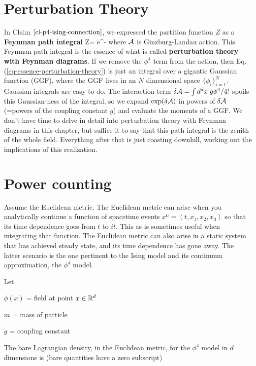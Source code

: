  


\section{Perturbation Theory}

 In Claim $\ref{cl-p4-ising-connection}$, we expressed the  partition function $Z$ as a {\bf Feynman path integral}
\beq
Z= \int \cald\phi\; e^{-\cala}
\label{eq-essence-perturbation-theory}
\eeq
where ${\cal A}$ is 
Ginzburg-Landau action. 
This Feynman path integral
is the essence
of what is called {\bf perturbation
theory with Feynman diagrams}.
If we remove the $\phi^4$ term
from the action, then Eq.(\ref{eq-essence-perturbation-theory}) is just an integral over a  gigantic Gaussian function (GGF), where the GGF lives in an $N$ dimensional space $\{\phi_i\}_{i=1}^N$.
Gaussian integrals are easy to do. The interaction term $\delta {\cal A}=\int d^dx\;g\phi^4/4!$ spoils this Gaussian-ness of the integral, so we expand $\exp(\delta {\cal A})$ in powers of $\delta {\cal A}$ (=powers of the coupling constant $g$)
and evaluate the moments of a GGF. We don't have time
to delve in detail into 
perturbation theory with Feynman diagrams
in this chapter, 
but suffice it to say that this path integral is the zenith of the whole field.
Everything after that is just coasting  downhill, working out the implications of this realization.

\section{Power counting}



Assume the Euclidean metric.
The Euclidean metric can arise
when you analytically
continue a function of spacetime events $x^\mu=(t, x_1, x_2, x_3)$ so that its time
dependence goes from $t$ to $it$. This
as is sometimes useful when integrating that function.
The Euclidean metric can also arise in a
static system that has achieved steady state,
and its time dependence has
gone away. The latter scenario
is the one pertinent to the 
Ising model and its continuum
approximation, the $\phi^4$ model.

Let

$ \phi(x)$ =  field at point $x\in { \mathbb{R}}^d$

$m$ = mass of particle

$ g$ = coupling constant


The bare Lagrangian density,
in the Euclidean metric, for
the $\phi^4$ model in $d$ dimensions is
(bare quantities have a zero subscript)


